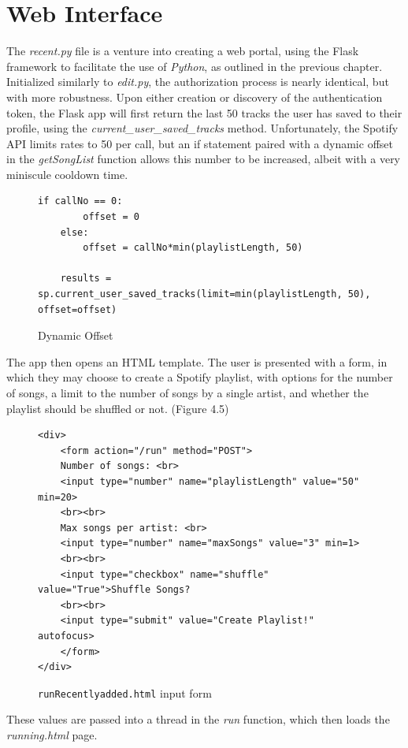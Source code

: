 \section{Web Interface}
The \textit{recent.py} file is a venture into creating a web portal, using the Flask
framework to facilitate the use of \textit{Python}, as outlined in the previous
chapter. Initialized similarly to \textit{edit.py}, the authorization process
is nearly identical, but with more robustness. Upon either creation or discovery
of the authentication token, the Flask app will first return the last 50 tracks
the user has saved to their profile, using the \textit{current\_user\_saved\_tracks}
method. Unfortunately, the Spotify API limits rates to 50 per call, but an if statement
paired with a dynamic offset in the \textit{getSongList} function allows this
number to be increased, albeit with a very miniscule cooldown time.

\begin{figure}[!h]
\begin{lstlisting}
if callNo == 0:
        offset = 0
    else:
        offset = callNo*min(playlistLength, 50)

    results = sp.current_user_saved_tracks(limit=min(playlistLength, 50), offset=offset)
\end{lstlisting}
\caption{Dynamic Offset}
\end{figure}


The app then opens an HTML template. The user is
presented with a form, in which they may choose to create a Spotify playlist,
with options for the number of songs, a limit to the number of songs by a single
artist, and whether the playlist should be shuffled or not. (Figure 4.5)

\begin{figure}[!h]
\begin{lstlisting}
<div>
    <form action="/run" method="POST">
    Number of songs: <br>
    <input type="number" name="playlistLength" value="50" min=20>
    <br><br>
    Max songs per artist: <br>
    <input type="number" name="maxSongs" value="3" min=1>
    <br><br>
    <input type="checkbox" name="shuffle" value="True">Shuffle Songs?
    <br><br>
    <input type="submit" value="Create Playlist!" autofocus>
    </form>
</div>
\end{lstlisting}
\caption{{\tt runRecentlyadded.html} input form}
\end{figure}



These values are passed into a thread in the \textit{run} function, which then
loads the \textit{running.html} page.

